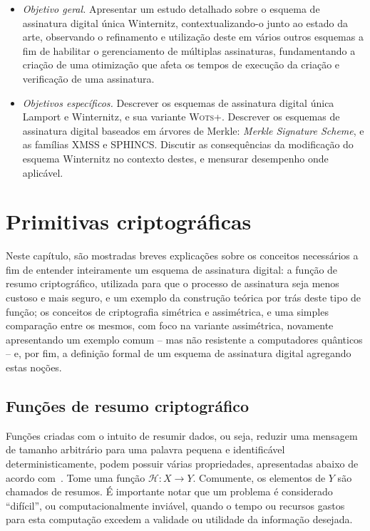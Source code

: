 \documentclass[12pt]{report}
\begin{document}
\begin{itemize}

\item \emph{Objetivo geral.} Apresentar um estudo detalhado sobre o esquema de
    assinatura digital única Winternitz, contextualizando-o junto ao estado da
    arte, observando o refinamento e utilização deste em vários outros esquemas
    a fim de habilitar o gerenciamento de múltiplas assinaturas, fundamentando
    a criação de uma otimização que afeta os tempos de execução da criação e
    verificação de uma assinatura.
    
\item \emph{Objetivos específicos.} Descrever os esquemas de assinatura digital
    única Lamport e Winternitz, e sua variante \textsc{Wots+}. Descrever
    os esquemas de assinatura digital baseados em árvores de Merkle: \emph{Merkle
    Signature Scheme}, e as famílias XMSS e SPHINCS. Discutir as consequências
    da modificação do esquema Winternitz no contexto destes, e mensurar desempenho
    onde aplicável.

\end{itemize}

\chapter{Primitivas criptográficas}

Neste capítulo, são mostradas breves explicações sobre os conceitos
necessários a fim de entender inteiramente um esquema de assinatura digital:
a função de resumo criptográfico, utilizada para que o processo de assinatura
seja menos custoso e mais seguro, e um exemplo da construção teórica por trás
deste tipo de função; os conceitos de criptografia simétrica e assimétrica, e
uma simples comparação entre os mesmos, com foco na variante assimétrica,
novamente apresentando um exemplo comum -- mas não resistente a computadores
quânticos -- e, por fim, a definição formal de um esquema de assinatura digital
agregando estas noções.

\section{Funções de resumo criptográfico}

Funções criadas com o intuito de resumir dados, ou seja, reduzir uma mensagem
de tamanho arbitrário para uma palavra pequena e identificável
deterministicamente, podem possuir várias propriedades,
apresentadas abaixo de acordo com~\cite[9.2]{Menezes:1996:HAC:548089}.
Tome uma função $\mathcal{H} : X \longrightarrow Y$. Comumente, os elementos de $Y$
são chamados de resumos. É importante notar que um problema é considerado
``difícil'', ou computacionalmente inviável, quando o tempo ou recursos gastos
para esta computação excedem a validade ou utilidade da informação desejada.
\end{document}
